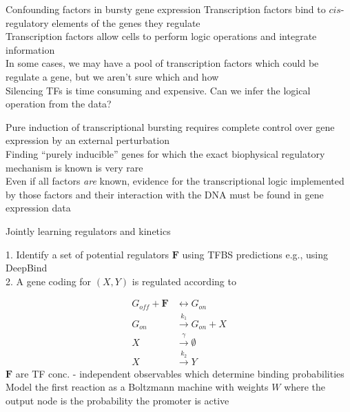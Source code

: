 \documentclass[aspectratio=1610]{beamer}					%
\begin{document}
\begin{frame}{Confounding factors in bursty gene expression}
Transcription factors bind to $cis$-regulatory elements of the genes they regulate\\
\vspace{0.1in}
Transcription factors allow cells to perform logic operations and integrate information\\
\vspace{0.1in}
In some cases, we may have a pool of transcription factors which could be regulate a gene, but we aren't sure which and how\\
\vspace{0.1in}
Silencing TFs is time consuming and expensive. Can we infer the logical operation from the data?

Pure induction of transcriptional bursting requires complete control over gene expression by an external perturbation\\
\vspace{0.1in}
Finding ``purely inducible'' genes for which the exact biophysical regulatory mechanism is known is very rare\\
\vspace{0.1in}
Even if all factors \emph{are} known, evidence for the transcriptional logic implemented by those factors and their interaction with the DNA must be found in gene expression data\\
\vspace{0.1in}
\end{frame}

\begin{frame}{Jointly learning regulators and kinetics}

1. Identify a set of potential regulators $\bm{F}$ using TFBS predictions e.g., using DeepBind\\
2. A gene coding for $(X,Y)$ is regulated according to 

\begin{align*}
G_{off} + \bm{F} &\leftrightarrow G_{on}\\
G_{on} &\overset{k_{1}}{\rightarrow} G_{on} + X\\
X &\overset{\gamma}{\rightarrow} \emptyset\\
X &\overset{k_{2}}{\rightarrow} Y
\end{align*}
$\bm{F}$ are TF conc. - independent observables which determine binding probabilities\\
\vspace{0.1in}
Model the first reaction as a Boltzmann machine with weights $W$ where the output node is the probability the promoter is active\\
\end{frame}
\end{document}
